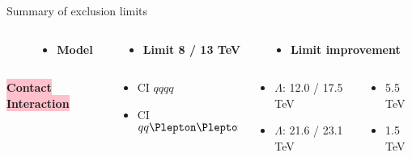 \documentclass[8pt]{beamer}
\newcommand{\mySmallCenterBox}[2][pink] {
   {\centering
    \noindent\colorbox{#1}{
	\textbf{{\small #2}}
    }\par
  }
}
\begin{document}
\begin{frame}{\large Summary of exclusion limits}
  \small

  \begin{columns}
  \begin{column}{3cm}
  \end{column}
  \begin{column}{3cm}
    \begin{itemize}
     \item[] \textbf{Model}
    \end{itemize}
  \end{column}
  \begin{column}{3.3cm}
    \begin{itemize}
     \item[] \textbf{Limit 8 / 13 TeV}
    \end{itemize}
  \end{column}
  \begin{column}{2.7cm}
    \begin{itemize}
     \item[] \textbf{Limit improvement}
    \end{itemize}
  \end{column}
 \end{columns}


  \begin{columns}
  \begin{column}{3cm}
    \mySmallCenterBox{Contact Interaction}
  \end{column}
  \begin{column}{3cm}
    \begin{itemize}
     \item[\XSolid] CI $qqqq$
     \item[\XSolid] CI $qq\Plepton\Plepton$
    \end{itemize}
  \end{column}
  \begin{column}{3.3cm}
    \begin{itemize}
     \item[] $\Lambda$: 12.0 / 17.5 TeV
     \item[] $\Lambda$: 21.6 / 23.1 TeV
    \end{itemize}
  \end{column}
  \begin{column}{2.7cm}
    \begin{itemize}
     \item[] 5.5 TeV
     \item[] 1.5 TeV
    \end{itemize}
  \end{column}
 \end{columns}
 

\end{frame}
\end{document}
